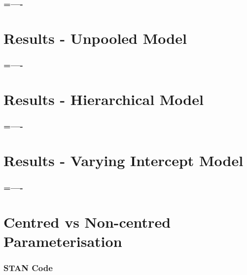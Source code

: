 \documentclass{beamer}
\begin{document}
\begin{frame}
\frametitle{=----}

\end{frame}


\section{Results - Unpooled Model}

\begin{frame}
\frametitle{=----}

\end{frame}

\section{Results - Hierarchical Model}

\begin{frame}
\frametitle{=----}

\end{frame}


\section{Results - Varying Intercept Model}

\begin{frame}
\frametitle{=----}

\end{frame}

\section{Centred vs Non-centred Parameterisation}

\begin{frame}
\frametitle{STAN Code}

\end{frame}
\end{document}
